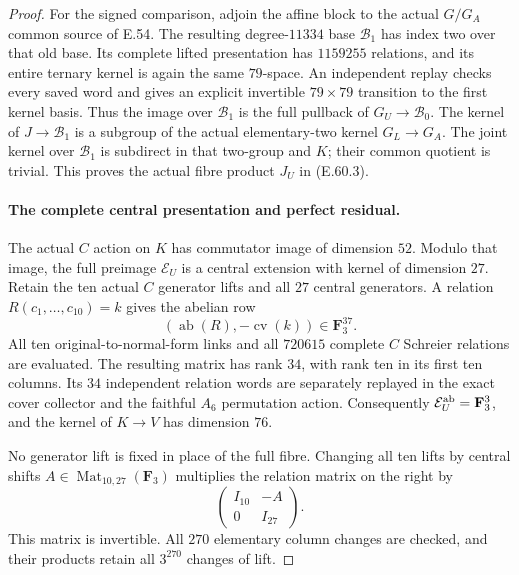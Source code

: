 \begin{proof}
For the signed comparison, adjoin the affine block to
the actual $G/G_A$ common source of E.54. The resulting
degree-$11334$ base $\mathcal B_1$ has index two over
that old base. Its complete lifted presentation has
$1159255$ relations, and its entire ternary kernel is
again the same $79$-space. An independent replay checks
every saved word and gives an explicit invertible
$79\times79$ transition to the first kernel basis.
Thus the image over $\mathcal B_1$ is the full pullback
of $G_U\to\mathcal B_0$. The kernel of
$J\to\mathcal B_1$ is a subgroup of the actual
elementary-two kernel $G_L\to G_A$.
The joint kernel over $\mathcal B_1$ is subdirect in
that two-group and $K$; their common quotient is trivial.
This proves the actual fibre product $J_U$ in
\textup{(E.60.3)}.

\paragraph{The complete central presentation and perfect residual.}
The actual $C$ action on $K$ has commutator image of
dimension $52$. Modulo that image, the full preimage
$\mathcal E_U$ is a central extension with kernel of
dimension $27$. Retain the ten actual $C$ generator
lifts and all $27$ central generators. A relation
$R(c_1,\ldots,c_{10})=k$ gives the abelian row
\[
              (\operatorname{ab}(R),-\operatorname{cv}(k))
                       \in\mathbf F_3^{37}.
 \tag{E.60.11}
\]
All ten original-to-normal-form links and all $720615$
complete $C$ Schreier relations are evaluated. The
resulting matrix has rank $34$, with rank ten in its
first ten columns. Its $34$ independent relation words
are separately replayed in the exact cover collector
and the faithful $A_6$ permutation action.
Consequently $\mathcal E_U^{\rm ab}=\mathbf F_3^3$,
and the kernel of $K\to V$ has dimension $76$.

No generator lift is fixed in place of the full fibre.
Changing all ten lifts by central shifts
$A\in\operatorname{Mat}_{10,27}(\mathbf F_3)$ multiplies
the relation matrix on the right by
\[
                 \begin{pmatrix}I_{10}&-A\\0&I_{27}\end{pmatrix}.
 \tag{E.60.12}
\]
This matrix is invertible. All $270$ elementary column
changes are checked, and their products retain all
$3^{270}$ changes of lift.


\end{proof}
